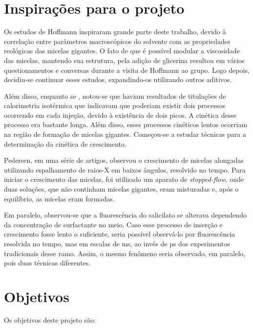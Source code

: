 		
		
		
		\chapter{Inspirações para o projeto} 

		Os estudos de Hoffmann inspiraram grande parte deste trabalho, devido à correlação entre parâmetros macroscópicos do solvente com as propriedades reológicas das micelas gigantes. O fato de que é possível modular a viscosidade das micelas, mantendo sua estrutura, pela adição de glicerina resultou em vários questionamentos e conversas durante a visita de Hoffmann ao grupo. Logo depois, decidiu-se continuar esses estudos, expandindo-os utilizando outros aditivos.
		
		Além disso, enquanto se , notou-se que haviam resultados de titulações de calorimetria isotérmica que indicavam que poderiam existir dois processos ocorrendo em cada injeção, devido à existência de dois picos. A cinética desse processo era bastante longa. Além disso, esses processos cinéticos lentos ocorriam na região de formação de micelas gigantes. Começou-se a estudar técnicas para a determinação da cinética de crescimento.
		
		Pedersen, em uma série de artigos, observou o crescimento de micelas alongadas utilizando espalhamento de raios-X em baixos ângulos, resolvido no tempo. Para iniciar o crescimento das micelas, foi utilizado um aparato de \emph{stopped-flow}, onde duas soluções, que não continham micelas gigantes, eram misturadas e, após o equilíbrio, as micelas eram formadas.  
		
		Em paralelo, observou-se que a fluorescência do salicilato se alterava dependendo da concentração de surfactante no meio. Caso esse processo de inserção e crescimento fosse lento o suficiente, seria possível observá-lo por fluorescência resolvida no tempo, mas em escalas de ms, ao invés de ps dos experimentos tradicionais desse ramo. Assim, o mesmo fenômeno seria observado, em paralelo, pois duas técnicas diferentes.
			
		
	\chapter{Objetivos}
		Os objetivos deste projeto são:
		
